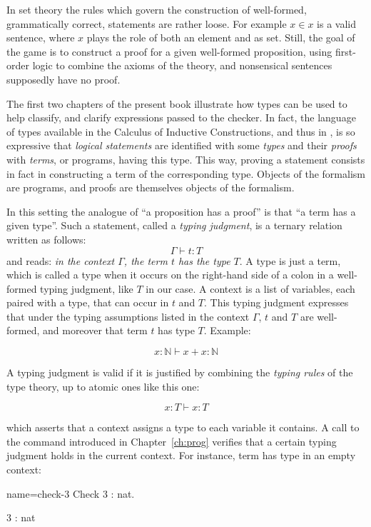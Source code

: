 In set theory the rules which govern the construction of
well-formed, grammatically correct, statements are rather loose.
For example
$x \in x$ is a valid sentence, where $x$ plays the role of
both an element and as set. Still, the
goal of the game is to construct a proof for a given well-formed
proposition, using first-order logic to combine the axioms of the
theory, and nonsensical sentences supposedly have no proof.

The first two chapters of the present book illustrate how
types can be used to help classify, and clarify expressions passed to
the checker. In fact, the language of types available in the Calculus
of Inductive Constructions, and thus in  \Coq{}, is so expressive that
\emph{logical statements} are identified with some \emph{types} and
their \emph{proofs} with \emph{terms}, or programs, having this
type. This way, proving a statement consists in fact in constructing a
term of the corresponding type. Objects of the formalism are programs,
and proofs are themselves objects of the formalism.

In this setting the analogue of ``a proposition has a proof''
is that ``a term has a given type''. Such a statement, called a
\emph{typing judgment}, is a ternary relation written as follows:
$$\Gamma \vdash t : T$$
and reads:
\emph{in the context $\Gamma$, the term $t$ has the type $T$}. A type
is just a term, which is called a type when it occurs on the right-hand
side of a colon in a well-formed typing judgment, like $T$ in
our case. A context is a list of variables, each paired with a type,
that can occur in $t$ and $T$. This typing judgment expresses that
under the typing assumptions listed in the context $\Gamma$, $t$ and
$T$ are well-formed, and moreover that term $t$ has type $T$. Example:

$$x : \mathbb{N} \vdash x + x : \mathbb{N}$$

A typing judgment is valid if it is justified by combining the \emph{typing rules} of the
type theory, up to atomic ones like this one:

$$x : T \vdash x : T$$

which asserts that a context assigns a type to each variable it contains.
A call to the  command introduced in Chapter~\ref{ch:prog} 
verifies that a certain typing judgment holds in the current
context. For instance, term  has type  in an empty context:

\begin{coq-left}{name=check-3}{}
Check 3 : nat.
\end{coq-left}
\begin{coqout-right}
3 : nat
\end{coqout-right}

